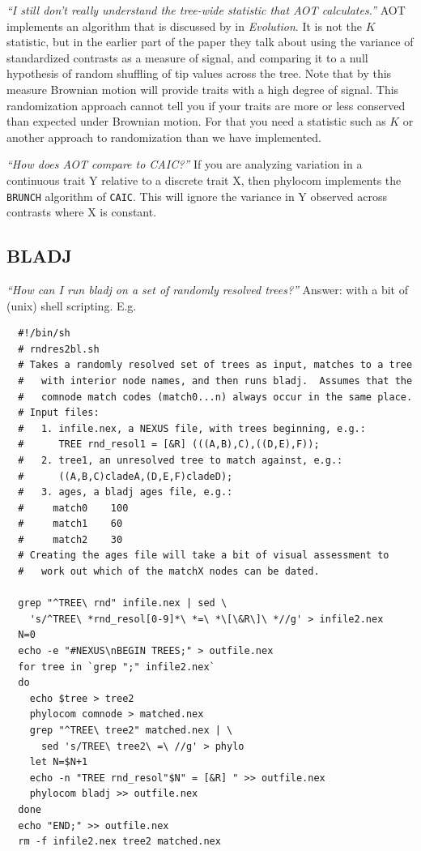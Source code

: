 \documentclass[12pt,letterpaper]{article}
\begin{document}
\textit{``I still don't really understand the tree-wide statistic
  that AOT calculates.''}  AOT implements an algorithm that is
discussed by \citet{blomberg2003tes} in \textit{Evolution}. It is not
the $K$ statistic, but in the earlier part of the paper they talk about
using the variance of standardized contrasts as a measure of signal,
and comparing it to a null hypothesis of random shuffling of tip values
across the tree. Note that by this measure Brownian motion will
provide traits with a high degree of signal. This randomization
approach cannot tell you if your traits are more or less conserved
than expected under Brownian motion. For that you need a statistic
such as $K$ or another approach to randomization than we have
implemented.

\textit{``How does AOT compare to CAIC?''}  If you are analyzing
variation in a continuous trait Y relative to a discrete trait X, then
phylocom implements the \texttt{BRUNCH} algorithm of
\texttt{CAIC}. This will ignore the variance in Y observed across
contrasts where X is constant.

\subsection{BLADJ}

\textit{``How can I run {\sc bladj} on a set of randomly resolved
  trees?''}  Answer: with a bit of (unix) shell scripting.  E.g.
\begin{verbatim}
  #!/bin/sh
  # rndres2bl.sh 
  # Takes a randomly resolved set of trees as input, matches to a tree
  #   with interior node names, and then runs bladj.  Assumes that the
  #   comnode match codes (match0...n) always occur in the same place.
  # Input files: 
  #   1. infile.nex, a NEXUS file, with trees beginning, e.g.:
  #      TREE rnd_resol1 = [&R] (((A,B),C),((D,E),F));
  #   2. tree1, an unresolved tree to match against, e.g.:
  #      ((A,B,C)cladeA,(D,E,F)cladeD);
  #   3. ages, a bladj ages file, e.g.:
  #     match0    100
  #     match1    60
  #     match2    30
  # Creating the ages file will take a bit of visual assessment to
  #   work out which of the matchX nodes can be dated.

  grep "^TREE\ rnd" infile.nex | sed \
    's/^TREE\ *rnd_resol[0-9]*\ *=\ *\[\&R\]\ *//g' > infile2.nex
  N=0
  echo -e "#NEXUS\nBEGIN TREES;" > outfile.nex
  for tree in `grep ";" infile2.nex`
  do
    echo $tree > tree2
    phylocom comnode > matched.nex
    grep "^TREE\ tree2" matched.nex | \
      sed 's/TREE\ tree2\ =\ //g' > phylo
    let N=$N+1
    echo -n "TREE rnd_resol"$N" = [&R] " >> outfile.nex
    phylocom bladj >> outfile.nex
  done
  echo "END;" >> outfile.nex
  rm -f infile2.nex tree2 matched.nex
\end{verbatim}
\end{document}
